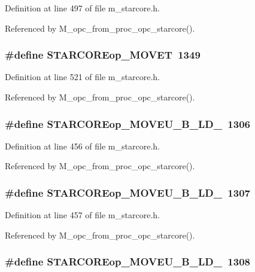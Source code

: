 Definition at line 497 of file m\_\-starcore.h.

Referenced by M\_\-opc\_\-from\_\-proc\_\-opc\_\-starcore().
\subsubsection{\setlength{\rightskip}{0pt plus 5cm}\#define STARCOREop\_\-MOVET~1349}\label{m__starcore_8h_983801ccd0d4f690b72b151d887cad2a}




Definition at line 521 of file m\_\-starcore.h.

Referenced by M\_\-opc\_\-from\_\-proc\_\-opc\_\-starcore().
\subsubsection{\setlength{\rightskip}{0pt plus 5cm}\#define STARCOREop\_\-MOVEU\_\-B\_\-LD\_~1306}\label{m__starcore_8h_8285f7fec26fbc56fee55ea8b8b62174}




Definition at line 456 of file m\_\-starcore.h.

Referenced by M\_\-opc\_\-from\_\-proc\_\-opc\_\-starcore().
\subsubsection{\setlength{\rightskip}{0pt plus 5cm}\#define STARCOREop\_\-MOVEU\_\-B\_\-LD\_~1307}\label{m__starcore_8h_74634a6bee0fb6cd66a5fb87cace3eb8}




Definition at line 457 of file m\_\-starcore.h.

Referenced by M\_\-opc\_\-from\_\-proc\_\-opc\_\-starcore().
\subsubsection{\setlength{\rightskip}{0pt plus 5cm}\#define STARCOREop\_\-MOVEU\_\-B\_\-LD\_~1308}\label{m__starcore_8h_75a7496dae459c7437b26507c43fa733}




